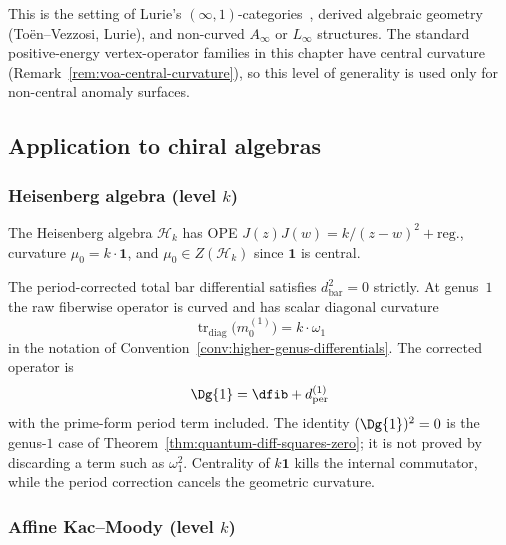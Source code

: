 This is the setting of Lurie's $(\infty, 1)$-categories~\cite{HTT},
derived algebraic geometry (To\"en--Vezzosi, Lurie), and non-curved
$A_\infty$ or $L_\infty$ structures. The standard positive-energy
vertex-operator families in this chapter have central curvature
(Remark~\ref{rem:voa-central-curvature}), so this level of generality
is used only for non-central anomaly surfaces.

\subsection{Application to chiral algebras}

\subsubsection{\texorpdfstring{Heisenberg algebra (level $k$)}{Heisenberg algebra (level k)}}

\begin{example}\label{ex:heisenberg-strict}
The Heisenberg algebra $\mathcal{H}_k$ has OPE $J(z)J(w) = k/(z-w)^2 + \text{reg.}$, curvature $\mu_0 = k \cdot \mathbf{1}$, and $\mu_0 \in Z(\mathcal{H}_k)$ since $\mathbf{1}$ is central.

The period-corrected total bar differential satisfies
$d_{\text{bar}}^2 = 0$ strictly.
At genus~$1$ the raw fiberwise operator is curved and has scalar
diagonal curvature
\[
\operatorname{tr}_{\mathrm{diag}}\!\bigl(m_0^{(1)}\bigr)
=k\cdot\omega_1
\]
in the notation of Convention~\ref{conv:higher-genus-differentials}.
The corrected operator is
\[
\Dg{1}=\dfib+d_{\mathrm{per}}^{(1)}
\]
with the prime-form period term included. The identity
$(\Dg{1})^2=0$ is the genus-$1$ case of
Theorem~\ref{thm:quantum-diff-squares-zero}; it is not proved by
discarding a term such as $\omega_1^2$. Centrality of
$k\mathbf{1}$ kills the internal commutator, while the period
correction cancels the geometric curvature.
\end{example}

\subsubsection{\texorpdfstring{Affine Kac--Moody (level $k$)}{Affine Kac--Moody (level k)}}

